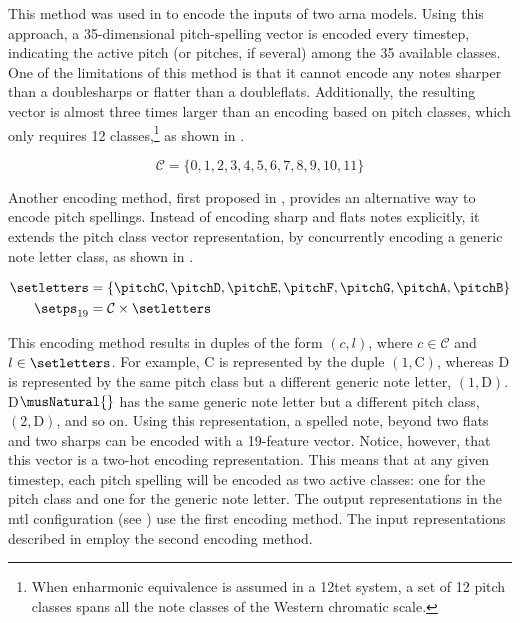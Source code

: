 This method was used in \textcite{micchi2020not,
micchi2021deep} to encode the inputs of two \gls{arna}
models. Using this approach, a 35-dimensional pitch-spelling
vector is encoded every timestep, indicating the active
pitch (or pitches, if several) among the 35 available
classes. One of the limitations of this method is that it
cannot encode any notes sharper than a \glspl{doublesharp}
or flatter than a \glspl{doubleflat}. Additionally, the
resulting vector is almost three times larger than an
encoding based on pitch classes, which only requires 12
classes,\footnote{When enharmonic equivalence is assumed in
a \gls{12tet} system, a set of 12 pitch classes spans all
the note classes of the Western chromatic scale.} as shown
in .

\begin{equation}
    \label{eq:pitch_classes}
    \mathcal{C} = \{0, 1, 2, 3, 4, 5, 6, 7, 8, 9, 10, 11\}
\end{equation}



Another encoding method, first proposed in
\textcite{napoleslopez2021augmentednet}, provides an
alternative way to encode pitch spellings. Instead of
encoding \gls{sharp} and \glspl{flat} notes explicitly, it
extends the pitch class vector representation, by
concurrently encoding a generic note letter class, as shown
in .

\begin{equation}
    \label{eq:pitch_spelling_19}
    \begin{split}
        \setletters &= \{ \pitchC, \pitchD, \pitchE, \pitchF, \pitchG, \pitchA, \pitchB \} \\ 
        \setps_{19} &= \mathcal{C}
        \times \setletters
    \end{split}
\end{equation}


This encoding method results in duples of the form $(c, l)$,
where $c \in \mathcal{C}$ and $l \in \setletters$. For
example, C\musSharp{} is represented by the duple $(1,
\text{C})$, whereas D\musFlat{} is represented by the same
pitch class but a different generic note letter, $(1,
\text{D})$. D$\musNatural{}$ has the same generic note
letter but a different pitch class, $(2, \text{D})$, and so
on. Using this representation, a spelled note, beyond two
flats and two sharps can be encoded with a 19-feature
vector. Notice, however, that this vector is a two-hot
encoding representation. This means that at any given
timestep, each pitch spelling will be encoded as two active
classes: one for the pitch class and one for the generic
note letter. The output representations in the \gls{mtl}
configuration (see ) use
the first encoding method. The input representations
described in  employ the
second encoding method. 
